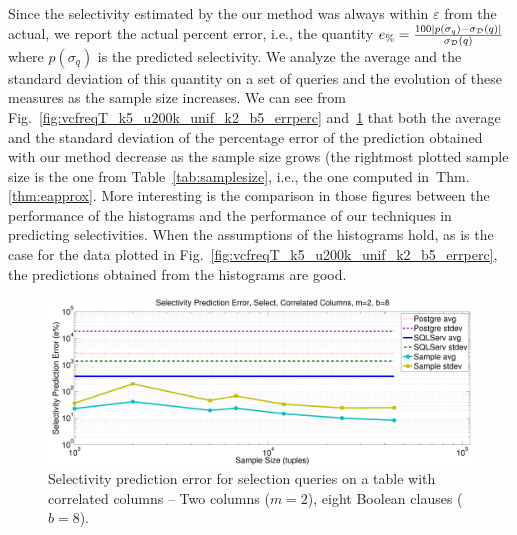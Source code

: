 Since the selectivity estimated by the our method was always within $\varepsilon$
from the actual, we report the actual percent error, i.e., the quantity
$e_\%=\frac{100|p(\sigma_q)-\sigma_{\cal D}(q)|}{\sigma_{\cal D}(q)}$ where $p(\sigma_q)$
is the predicted selectivity. We analyze the average and the standard deviation
of this quantity on a set of queries and the evolution of these measures as
the sample size increases. We can see from
Fig.~\ref{fig:vcfreqT_k5_u200k_unif_k2_b5_errperc}
and~\ref{fig:vcfreqT_k2_correl_k2_b8_errperc} that both the average and the standard
deviation of the percentage error of the prediction obtained with our method
decrease as the sample size grows (the rightmost plotted
sample size is the one from Table~\ref{tab:samplesize}, i.e., the one computed 
in~Thm.\ref{thm:eapprox}. More interesting is the comparison in those figures between the performance of the
histograms and the performance of our techniques in predicting selectivities. When
the assumptions of the histograms hold, as is the case for the data plotted in
Fig.~\ref{fig:vcfreqT_k5_u200k_unif_k2_b5_errperc}, the predictions obtained from the
histograms are good. 

\begin{figure}[tp]
  \centering
  \includegraphics[scale=0.3]{vcfreq/T_k2_correl_k2_b8_errperc}
  \caption{Selectivity prediction error for selection queries on a table with
  correlated columns -- Two columns ($m=2$), eight Boolean clauses ($b=8$).}
  \label{fig:vcfreqT_k2_correl_k2_b8_errperc}
\end{figure}

